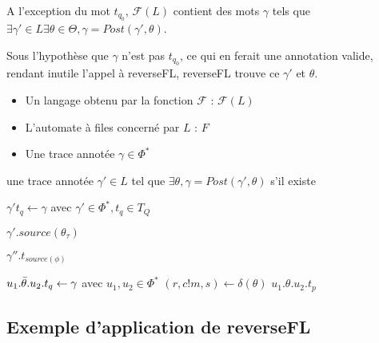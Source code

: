 A l'exception du mot $t_{q_0}$, $\mathcal{F}(L)$ contient des mots $\gamma$ tels que $\exists \gamma'\in L \exists \theta\in\Theta, \gamma=Post(\gamma',\theta)$.

Sous l'hypothèse que $\gamma$ n'est pas $t_{q_0}$, ce qui en ferait une annotation valide, rendant inutile l'appel à reverseFL, reverseFL trouve ce $\gamma'$ et $\theta$.

\begin{algo}[reverseFL]
    \begin{algorithmic}[1]
        \REQUIRE
        \begin{itemize}
            \item Un langage obtenu par la fonction $\mathcal{F}$ : $\mathcal{F}(L)$
            \item L'automate à files concerné par $L$  : $F$
            \item Une trace annotée $\gamma\in\Phi^*$
        \end{itemize}
        \ENSURE une trace annotée $\gamma'\in L$ tel que $\exists \theta, \gamma=Post(\gamma',\theta)$ s'il existe

          \STATE $\gamma' t_q \leftarrow \gamma$ avec $\gamma'\in\Phi^*,t_q\in T_Q$

              \RETURN $\gamma'.source(\theta_\tau)$
            \ENDIF
          \ENDIF

              \RETURN $\gamma''.t_{source(\phi)}$
            \ENDIF

              \STATE $u_1.\bar{\theta}.u_2.t_q \leftarrow \gamma$ avec $u_1,u_2 \in \Phi^*$
              \STATE $(r, c!m, s)\leftarrow\delta(\theta)$
                  \RETURN $u_1.\theta.u_2.t_p$
                \ENDIF
              \ENDFOR
            \ENDFOR
          \ENDIF
        \ENDIF
    \end{algorithmic}
\end{algo}


\subsection{Exemple d'application de reverseFL}

